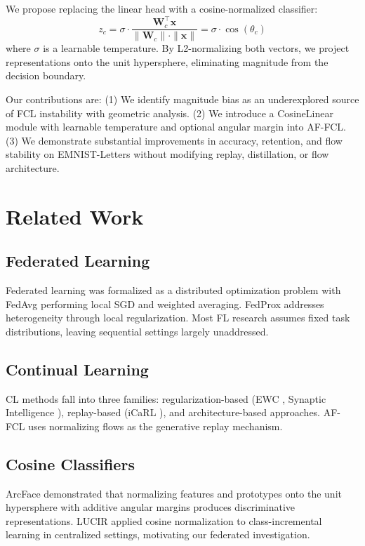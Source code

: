 \documentclass[conference]{IEEEtran}
\begin{document}
We propose replacing the linear head with a cosine-normalized classifier:
\begin{equation}
z_c = \sigma \cdot \frac{\mathbf{W}_c^\top \mathbf{x}}{\|\mathbf{W}_c\| \cdot \|\mathbf{x}\|} = \sigma \cdot \cos(\theta_c)
\end{equation}
where $\sigma$ is a learnable temperature. By L2-normalizing both vectors, we project representations onto the unit hypersphere, eliminating magnitude from the decision boundary.

Our contributions are: (1) We identify magnitude bias as an underexplored source of FCL instability with geometric analysis. (2) We introduce a CosineLinear module with learnable temperature and optional angular margin into AF-FCL. (3) We demonstrate substantial improvements in accuracy, retention, and flow stability on EMNIST-Letters without modifying replay, distillation, or flow architecture.

\section{Related Work}

\subsection{Federated Learning}
Federated learning was formalized as a distributed optimization problem with FedAvg \cite{mcmahan2017} performing local SGD and weighted averaging. FedProx \cite{li2020} addresses heterogeneity through local regularization. Most FL research assumes fixed task distributions, leaving sequential settings largely unaddressed.

\subsection{Continual Learning}
CL methods fall into three families: regularization-based (EWC \cite{kirkpatrick2017}, Synaptic Intelligence \cite{aljundi2018}), replay-based (iCaRL \cite{rebuffi2017}), and architecture-based approaches. AF-FCL uses normalizing flows as the generative replay mechanism.

\subsection{Cosine Classifiers}
ArcFace \cite{deng2019} demonstrated that normalizing features and prototypes onto the unit hypersphere with additive angular margins produces discriminative representations. LUCIR \cite{hou2019} applied cosine normalization to class-incremental learning in centralized settings, motivating our federated investigation.
\end{document}
